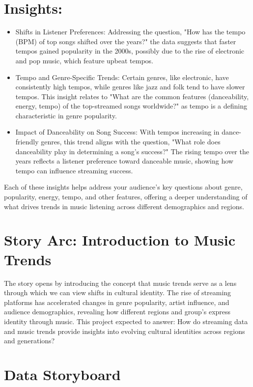 \documentclass[12pt]{article}
\begin{document}
\section*{Insights:}
\begin{itemize}
  \item Shifts in Listener Preferences: Addressing the question, "How has the tempo (BPM) of top songs shifted over the years?" the data suggests that faster tempos gained popularity in the 2000s, possibly due to the rise of electronic and pop music, which feature upbeat tempos.
  \item Tempo and Genre-Specific Trends: Certain genres, like electronic, have consistently high tempos, while genres like jazz and folk tend to have slower tempos. This insight relates to "What are the common features (danceability, energy, tempo) of the top-streamed songs worldwide?" as tempo is a defining characteristic in genre popularity.
  \item Impact of Danceability on Song Success: With tempos increasing in dance-friendly genres, this trend aligns with the question, "What role does danceability play in determining a song's success?" The rising tempo over the years reflects a listener preference toward danceable music, showing how tempo can influence streaming success.
\end{itemize}

Each of these insights helps address your audience's key questions about genre, popularity, energy, tempo, and other features, offering a deeper understanding of what drives trends in music listening across different demographics and regions.

\section*{Story Arc: Introduction to Music Trends}
The story opens by introducing the concept that music trends serve as a lens through which we can view shifts in cultural identity. The rise of streaming platforms has accelerated changes in genre popularity, artist influence, and audience demographics, revealing how different regions and group's express identity through music. This project expected to answer: How do streaming data and music trends provide insights into evolving cultural identities across regions and generations?

\section*{Data Storyboard}
\end{document}
